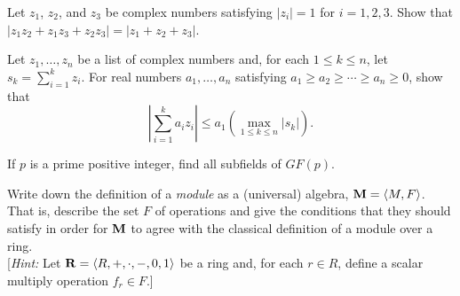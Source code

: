 \begin{problem}[Golan 16]
Let $z_1$, $z_2$, and $z_3$ be complex numbers satisfying 
$|z_i| = 1$ for $i = 1, 2, 3$. Show that 
$|z_1 z_2 + z_1 z_3 + z_2 z_3 | = |z_1 + z_2 + z_3|$.
\end{problem}
\smallskip
\begin{solution}


\end{solution}
\probskip




\begin{problem} 
Let $z_1, \dots, z_n$ be a list of complex
numbers and, for each $1 \leq k \leq n$, 
let $s_k = \sum_{i=1}^k z_i$. For real numbers
$a_1, \dots, a_n$ satisfying 
$a_1 \geq a_2 \geq \cdots \geq a_n \geq 0$, 
show that
\begin{equation}
\label{eq:Abels}  
\left| \sum_{i=1}^k a_i z_i \right| 
\leq a_1 \left( \max_{1 \leq k \leq n} |s_k|\right).
\end{equation}
\end{problem}
\smallskip
\begin{solution}


\end{solution}
\probskip



\begin{problem}[Golan 24]
If $p$ is a prime positive integer, find all subfields of $GF(p)$.
\end{problem}


\begin{solution}


\end{solution}
\probskip
\begin{problem}
Write down the definition of a \emph{module} as a (universal) algebra, 
$\mathbf{M} = \langle M, F\rangle$.  That is, describe the set $F$ of operations and 
give the conditions that they should satisfy in order for $\mathbf{M}$ to 
agree with the classical definition of a module over a ring.\\[4pt]
[{\it Hint:} Let $\mathbf{R} = \langle R, +, \cdot, -, 0, 1\rangle$ be a ring and,
  for each $r\in R$, define a scalar multiply operation $f_r \in F$.]
\end{problem}

